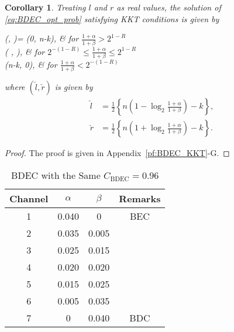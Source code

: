 \documentclass[10pt,twocolumn,twoside,submit]{JCNtran}
\newtheorem{corollary}[theorem]{Corollary}
\begin{document}
	\begin{corollary} \label{cor:BDEC_KKT} Treating $l$ and $r$ as real values, the solution of \eqref{eq:BDEC_opt_prob} satisfying KKT conditions is given by
		\begin{numcases}{(, )=}
		(0, n-k), & \hspace{-5mm} for $\frac{1+\alpha}{1+\beta} > 2^{1 - R} $ \label{eq:BDEC_opt_sol_con1}
		\\
		\left( ,   \right),  & \hspace{-5mm} for $2^{-(1 - R)} \le \frac{1+\alpha}{1+\beta} \le 2^{1 - R} $ \label{eq:BDEC_opt_sol_con3}
		\\
		(n-k, 0), & \hspace{-5mm} for $\frac{1+\alpha}{1+\beta} < 2^{-(1 - R)}$ \label{eq:BDEC_opt_sol_con2}
		\end{numcases}
		where $\left( \check{l}, \check{r} \right)$ is given by
		\begin{align}
		\check{l} &= \frac{1}{2} \left\{ n \left( 1 - \log_2{\frac{1+\alpha}{1 +\beta}} \right) - k \right\}, \label{eq:BDEC_opt_sol_1} \\
		\check{r} &= \frac{1}{2} \left\{ n \left( 1 + \log_2{\frac{1+\alpha}{1 +\beta}} \right) - k \right\}. \label{eq:BDEC_opt_sol_2}
		\end{align}
	\end{corollary}
	\begin{proof}
		The proof is given in Appendix~\ref{pf:BDEC_KKT}-G.
	\end{proof}

	\begin{table}[t]
	\renewcommand{\arraystretch}{1.3}
	\caption{BDEC with the Same $C_{\text{BDEC}}=0.96$}
	\label{tab:BDEC_channel}
	\centering
	{\hfill{}
		\small{
			\begin{tabular}{c|c|c|c}
				\hline
				Channel & {$\alpha$} & {$\beta$} & {Remarks} \\ \hline \hline
				1       & 0.040 & 0 & BEC \\ \hline
				2       & 0.035 & 0.005 &  \\ \hline
				3       & 0.025 & 0.015 &  \\ \hline
				4       & 0.020 & 0.020 &  \\ \hline
				5       & 0.015 & 0.025 &  \\ \hline
				6       & 0.005 & 0.035 &  \\ \hline
				7       & 0 & 0.040 & BDC \\  \hline
		\end{tabular}}
	}
	\hfill{}
	\vspace{-3mm}
\end{table}
		
\end{document}
